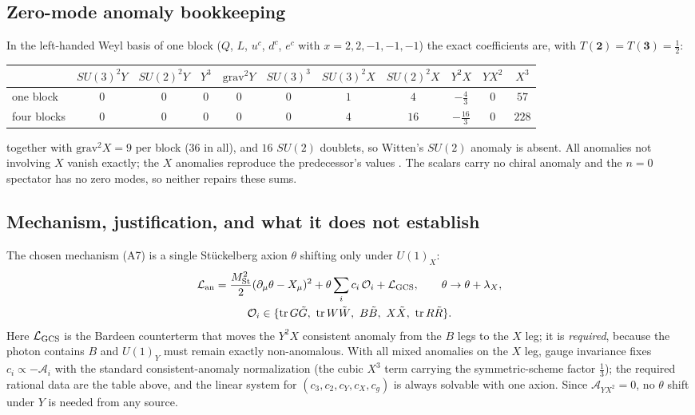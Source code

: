 \documentclass[11pt,letterpaper]{article}
\DeclareMathOperator{\tr}{tr}
\begin{document}
\subsection{Zero-mode anomaly bookkeeping}

In the left-handed Weyl basis of one block ($Q$, $L$, $u^c$, $d^c$, $e^c$ with $x=2,2,-1,-1,-1$) the exact coefficients are, with $T(\mathbf 2)=T(\mathbf 3)=\tfrac12$:

\begin{center}\footnotesize
\begin{tabular}{@{}lcccccccccc@{}}
\toprule
 & $SU(3)^2Y$ & $SU(2)^2Y$ & $Y^3$ & $\mathrm{grav}^2Y$ & $SU(3)^3$ & $SU(3)^2X$ & $SU(2)^2X$ & $Y^2X$ & $YX^2$ & $X^3$ \\
\midrule
one block & 0 & 0 & 0 & 0 & 0 & $1$ & $4$ & $-\tfrac43$ & $0$ & $57$\\
four blocks & 0 & 0 & 0 & 0 & 0 & $4$ & $16$ & $-\tfrac{16}3$ & $0$ & $228$\\
\bottomrule
\end{tabular}
\end{center}
together with $\text{grav}^2X=9$ per block ($36$ in all), and $16$ $SU(2)$ doublets, so Witten's $SU(2)$ anomaly \cite{Witten} is absent. All anomalies not involving $X$ vanish exactly; the $X$ anomalies reproduce the predecessor's values \cite{neutral}. The scalars carry no chiral anomaly and the $n=0$ spectator has no zero modes, so neither repairs these sums.

\subsection{Mechanism, justification, and what it does not establish}

The chosen mechanism (A7) is a single Stückelberg axion $\theta$ shifting only under $U(1)_X$:
\begin{gather}
\mathcal L_{\rm an}=\frac{M_{\rm St}^2}2(\partial_\mu\theta-X_\mu)^2+\theta\sum_{i}c_i\,\mathcal O_i+\mathcal L_{\rm GCS},\qquad \theta\to\theta+\lambda_X,\nonumber\\
\mathcal O_i\in\{\tr G\tilde G,\ \tr W\tilde W,\ B\tilde B,\ X\tilde X,\ \tr R\tilde R\}.
\end{gather}
Here $\mathcal L_{\rm GCS}$ is the Bardeen counterterm \cite{Bardeen,ABDK} that moves the $Y^2X$ consistent anomaly from the $B$ legs to the $X$ leg; it is \emph{required}, because the photon contains $B$ and $U(1)_Y$ must remain exactly non-anomalous. With all mixed anomalies on the $X$ leg, gauge invariance fixes $c_i\propto-\mathcal A_i$ with the standard consistent-anomaly normalization (the cubic $X^3$ term carrying the symmetric-scheme factor $\tfrac13$); the required rational data are the table above, and the linear system for $(c_3,c_2,c_Y,c_X,c_g)$ is always solvable with one axion. Since $\mathcal A_{YX^2}=0$, no $\theta$ shift under $Y$ is needed from any source.
\end{document}
